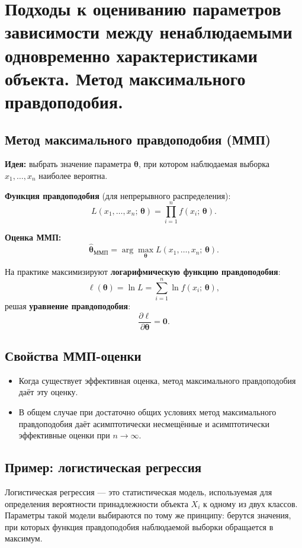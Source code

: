 \section{Подходы к оцениванию параметров зависимости между ненаблюдаемыми одновременно характеристиками объекта. Метод максимального правдоподобия.}

\subsection*{Метод максимального правдоподобия (ММП)}

\textbf{Идея:} выбрать значение параметра $\boldsymbol{\theta}$, при котором наблюдаемая выборка $x_1, \ldots, x_n$ наиболее вероятна.

\textbf{Функция правдоподобия} (для непрерывного распределения):
\[
  L(x_1,\ldots,x_n;\,\boldsymbol{\theta}) = \prod_{i=1}^{n} f(x_i;\,\boldsymbol{\theta}).
\]

\textbf{Оценка ММП:}
\[
  \hat{\boldsymbol{\theta}}_{\text{ММП}} = \arg\max_{\boldsymbol{\theta}} L(x_1,\ldots,x_n;\,\boldsymbol{\theta}).
\]

На практике максимизируют \textbf{логарифмическую функцию правдоподобия}:
\[
  \ell(\boldsymbol{\theta}) = \ln L = \sum_{i=1}^n \ln f(x_i;\,\boldsymbol{\theta}),
\]
решая \textbf{уравнение правдоподобия}:
\[
  \frac{\partial \ell}{\partial \boldsymbol{\theta}} = \mathbf{0}.
\]

\subsection*{Свойства ММП-оценки}

\begin{itemize}
  \item Когда существует эффективная оценка, метод максимального правдоподобия даёт эту оценку.
  \item В общем случае при достаточно общих условиях метод максимального правдоподобия даёт асимптотически несмещённые и асимптотически эффективные оценки при $n\to\infty$.
\end{itemize}

\subsection*{Пример: логистическая регрессия}

Логистическая регрессия — это статистическая модель, используемая для определения вероятности принадлежности объекта $X_i$ к одному из двух классов. Параметры такой модели выбираются по тому же принципу: берутся значения, при которых функция правдоподобия наблюдаемой выборки обращается в максимум.

\clearpage
